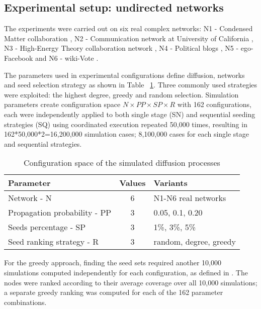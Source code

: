 \documentclass[11pt]{article} %
\begin{document}
\subsection*{Experimental setup: undirected networks}
The experiments were carried out on six real complex networks: N1 - Condensed Matter collaboration \cite{newman2001scientific}, N2 - Communication network at University of California \cite{opsahl2009clustering}, N3 - High-Energy Theory collaboration network \cite{newman2001structure}, N4 - Political blogs \cite{adamic2005political}, N5 - ego-Facebook \cite{leskovec2012learning} and N6 - wiki-Vote \cite{leskovec2010predicting}. 

The parameters used in experimental configurations define diffusion, networks and seed selection strategy as shown in Table ~\ref{tab:par}. Three commonly used strategies were exploited: the highest degree, greedy \cite{kempe2015} and random selection. Simulation parameters create configuration space $N \times  PP \times  SP \times R$ with 162 configurations, each were independently applied to both single stage (SN) and sequential seeding strategies (SQ) using coordinated execution repeated 50,000 times, resulting in 162*50,000*2=16,200,000 simulation cases; 8,100,000 cases for each single stage and sequential strategies.

\begin {table}
\centering
\begin{tabular}{ l c l } 
\hline
\textbf{Parameter}& \textbf {Values} & \textbf {Variants} \\ 
\hline
Network - N & 6 & N1-N6 real networks\\ 
\hline
Propagation probability - PP& 3&0.05, 0.1, 0.20 \\
\hline
Seeds percentage - SP & 3&1\%, 3\%, 5\% \\ 
\hline
Seed ranking strategy - R & 3 & random, degree, greedy \\
\hline
\end{tabular}
\caption {Configuration space of the simulated diffusion processes}
\label{tab:par} 
\end {table}

For the greedy approach, finding the seed sets required another 10,000 simulations computed independently for each configuration, as defined in \cite{Kempe:2003, kempe2015}. The nodes were ranked according to their average coverage over all 10,000 simulations; a separate greedy ranking was computed for each of the 162 parameter combinations.
\end{document}
